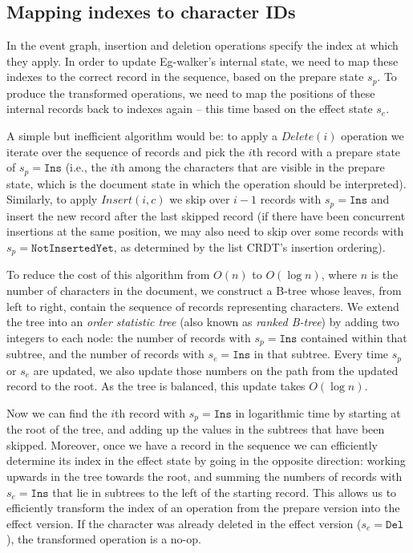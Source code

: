 \documentclass[sigplan,10pt]{acmart}
\newcommand{\algname}{Eg-walker\xspace}
\begin{document}
\subsection{Mapping indexes to character IDs}\label{b-trees}

In the event graph, insertion and deletion operations specify the index at which they apply.
In order to update \algname's internal state, we need to map these indexes to the correct record in the sequence, based on the prepare state $s_p$.
To produce the transformed operations, we need to map the positions of these internal records back to indexes again -- this time based on the effect state $s_e$.

A simple but inefficient algorithm would be: to apply a $\mathit{Delete}(i)$ operation we iterate over the sequence of records and pick the $i$th record with a prepare state of $s_p = \texttt{Ins}$ (i.e., the $i$th among the characters that are visible in the prepare state, which is the document state in which the operation should be interpreted).
Similarly, to apply $\mathit{Insert}(i, c)$ we skip over $i - 1$ records with $s_p = \texttt{Ins}$ and insert the new record after the last skipped record (if there have been concurrent insertions at the same position, we may also need to skip over some records with $s_p = \texttt{NotInsertedYet}$, as determined by the list CRDT's insertion ordering).

To reduce the cost of this algorithm from $O(n)$ to $O(\log n)$, where $n$ is the number of characters in the document, we construct a B-tree whose leaves, from left to right, contain the sequence of records representing characters.
We extend the tree into an \emph{order statistic tree} \cite{CLRS2009} (also known as \emph{ranked B-tree}) by adding two integers to each node: the number of records with $s_p = \texttt{Ins}$ contained within that subtree, and the number of records with $s_e = \texttt{Ins}$ in that subtree.
Every time $s_p$ or $s_e$ are updated, we also update those numbers on the path from the updated record to the root.
As the tree is balanced, this update takes $O(\log n)$.

Now we can find the $i$th record with $s_p = \texttt{Ins}$ in logarithmic time by starting at the root of the tree, and adding up the values in the subtrees that have been skipped.
Moreover, once we have a record in the sequence we can efficiently determine its index in the effect state by going in the opposite direction: working upwards in the tree towards the root, and summing the numbers of records with $s_e = \texttt{Ins}$ that lie in subtrees to the left of the starting record.
This allows us to efficiently transform the index of an operation from the prepare version into the effect version.
If the character was already deleted in the effect version ($s_e = \texttt{Del}$), the transformed operation is a no-op.
\end{document}

